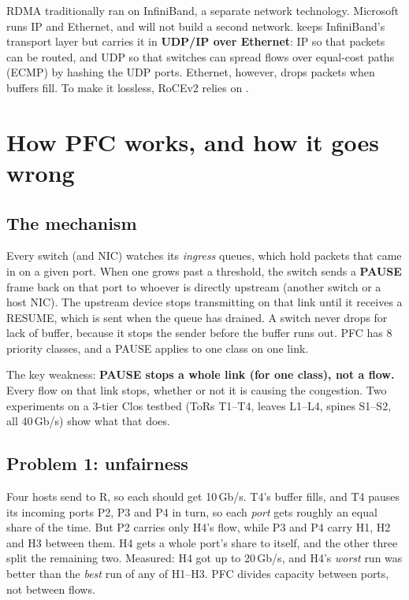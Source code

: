 RDMA traditionally ran on InfiniBand, a separate network technology. Microsoft runs IP and Ethernet, and will not build a second network.
 keeps InfiniBand's transport layer but carries it in \textbf{UDP/IP over Ethernet}: IP so that packets can be routed, and UDP so
that switches can spread flows over equal-cost paths (ECMP) by hashing the UDP ports. Ethernet, however, drops packets when buffers fill. To
make it lossless, RoCEv2 relies on .

\section{How PFC works, and how it goes wrong}

\subsection{The mechanism}
Every switch (and NIC) watches its \emph{ingress} queues, which hold packets that came in on a given port. When one grows past a threshold, the
switch sends a \textbf{PAUSE} frame back on that port to whoever is directly upstream (another switch or a host NIC). The upstream device
stops transmitting on that link until it receives a RESUME, which is sent when the queue has drained. A switch never drops for lack of buffer,
because it stops the sender before the buffer runs out. PFC has 8 priority classes, and a PAUSE applies to one class on one link.

The key weakness: \textbf{PAUSE stops a whole link (for one class), not a flow.} Every flow on that link stops, whether or not it is causing
the congestion. Two experiments on a 3-tier Clos testbed (ToRs T1--T4, leaves L1--L4, spines S1--S2, all 40\,Gb/s) show what that does.

\subsection{Problem 1: unfairness}

Four hosts send to R, so each should get 10\,Gb/s. T4's buffer fills, and T4 pauses its incoming ports P2, P3 and P4 in turn, so each
\emph{port} gets roughly an equal share of the time. But P2 carries only H4's flow, while P3 and P4 carry H1, H2 and H3 between them. H4 gets
a whole port's share to itself, and the other three split the remaining two. Measured: H4 got up to 20\,Gb/s, and H4's \emph{worst} run was better
than the \emph{best} run of any of H1--H3. PFC divides capacity between ports, not between flows.

